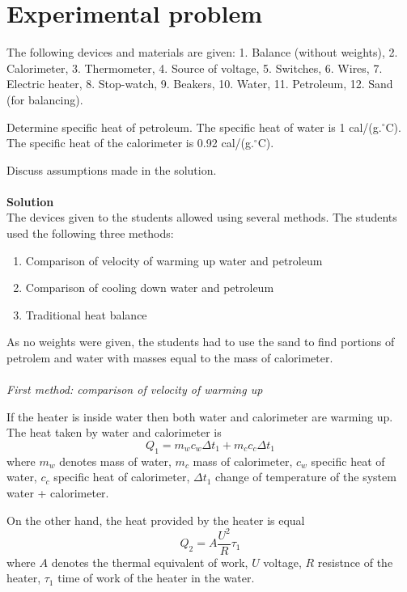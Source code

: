 \documentclass[12pt,a4paper]{book}
\begin{document}
\section*{Experimental problem}
	The following devices and materials are given: 1. Balance (without weights), 2. Calorimeter, 3. Thermometer, 4. Source of voltage, 5. Switches, 6. Wires, 7. Electric heater, 8. Stop-watch, 9. Beakers, 10. Water, 11. Petroleum, 12. Sand (for balancing).\par
	Determine specif\mbox{}ic heat of petroleum. The specif\mbox{}ic heat of water is 1 cal/(g.$^{\circ}\mathrm{C}$). The specif\mbox{}ic heat of the calorimeter is 0.92 cal/(g.$^{\circ}\mathrm{C}$).\par
	Discuss assumptions made in the solution.\\ \\
	\textbf{Solution}\\
	The devices given to the students allowed using several methods. The students used the following three methods:
	\begin{enumerate}
		\item Comparison of velocity of warming up water and petroleum
		\item Comparison of cooling down water and petroleum
		\item Traditional heat balance
	\end{enumerate}\par
	As no weights were given, the students had to use the sand to f\mbox{}ind portions of petrolem and water with masses equal to the mass of calorimeter.\\ \\
	\filbreak\noindent\emph{First method: comparison of velocity of warming up}\par
	If the heater is inside water then both water and calorimeter are warming up. The heat taken by water and calorimeter is
	\begin{equation*}
		Q_1=m_wc_w\Delta t_1+m_cc_c\Delta t_1
	\end{equation*}
	where $m_w$ denotes mass of water, $m_c$ mass of calorimeter, $c_w$ specif\mbox{}ic heat of water, $c_c$ specif\mbox{}ic heat of calorimeter, $\Delta t_1$ change of temperature of the system water + calorimeter.\par
	On the other hand, the heat provided by the heater is equal
	\begin{equation*}
		Q_2=A\frac{U^2}{R}\tau_1
	\end{equation*}
	where $A$ denotes the thermal equivalent of work, $U$ voltage, $R$ resistnce of the heater, $\tau_1$ time of work of the heater in the water.\par
\end{document}
